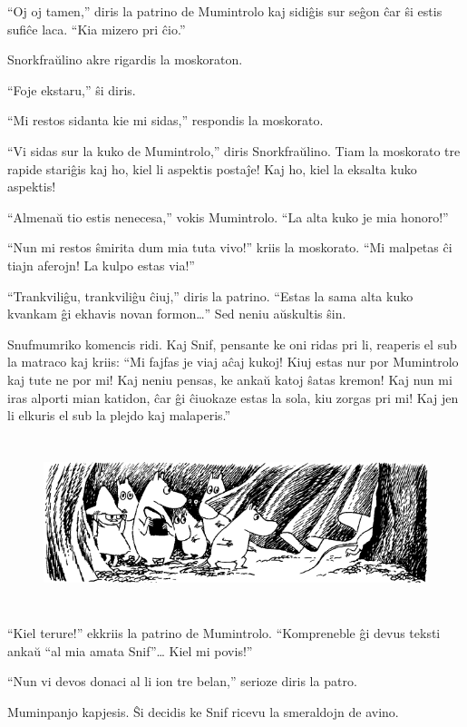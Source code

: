 ``Oj oj tamen,'' diris la patrino de Mumintrolo kaj sidiĝis sur seĝon ĉar ŝi estis sufiĉe laca. ``Kia mizero pri ĉio.''

Snorkfraŭlino akre rigardis la moskoraton.

``Foje ekstaru,'' ŝi diris.

``Mi restos sidanta kie mi sidas,'' respondis la moskorato.

``Vi sidas sur la kuko de Mumintrolo,'' diris Snorkfraŭlino. Tiam la moskorato tre rapide stariĝis kaj ho, kiel li aspektis postaĵe! Kaj ho, kiel la eksalta kuko aspektis!

``Almenaŭ tio estis nenecesa,'' vokis Mumintrolo. ``La alta kuko je mia honoro!''

``Nun mi restos ŝmirita dum mia tuta vivo!'' kriis la moskorato. ``Mi malpetas ĉi tiajn aferojn! La kulpo estas via!''

``Trankviliĝu, trankviliĝu ĉiuj,'' diris la patrino. ``Estas la sama alta kuko kvankam ĝi ekhavis novan formon{\ldots}'' Sed neniu aŭskultis ŝin.

Snufmumriko komencis ridi. Kaj Snif, pensante ke oni ridas pri li, reaperis el sub la matraco kaj kriis: ``Mi fajfas je viaj aĉaj kukoj! Kiuj estas nur por Mumintrolo kaj tute ne por mi! Kaj neniu pensas, ke ankaŭ katoj ŝatas kremon! Kaj nun mi iras alporti mian katidon, ĉar ĝi ĉiuokaze estas la sola, kiu zorgas pri mi! Kaj jen li elkuris el sub la plejdo kaj malaperis.''

\begin{figure}[htbp]
\centering
\includegraphics[width=450pt,height=141pt]{9-7.png}
\caption{}
\label{9-7}
\end{figure}

``Kiel terure!'' ekkriis la patrino de Mumintrolo. ``Kompreneble ĝi devus teksti ankaŭ ``al mia amata Snif''{\ldots} Kiel mi povis!''

``Nun vi devos donaci al li ion tre belan,'' serioze diris la patro.

Muminpanjo kapjesis. Ŝi decidis ke Snif ricevu la smeraldojn de avino.

